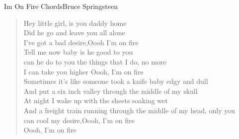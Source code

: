 \begin{song}{Im On Fire Chords}{Bruce Springsteen}
	
	\begin{verse}
		
		Hey little girl, is you daddy home \\
		Did he go and leave you all alone \\
		I’ve got a bad desire,\qquad {}Oooh I’m on fire \\
		
		Tell me now baby is he good to you \\
		can he do to you the things that I do, no more \\
		I can take you higher Oooh, I’m on fire \\
		
		Sometimes it’s like someone took a knife baby edgy and dull \\
		And put a six inch valley through the middle of my skull \qquad{} \\
		
		At night I wake up with the sheets soaking wet \\
		And a freight train running through the middle of my head, only you \\
		can cool my desire,\qquad {}Oooh, I’m on fire \\
		
		Oooh, I’m on fire \\
	\end{verse}
	
	
\end{song}